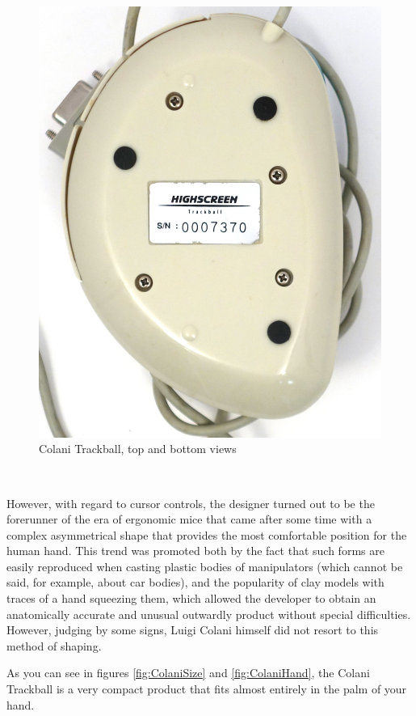 \documentclass[11pt, a4paper]{article}
\begin{document}
\begin{figure}[h]
    \includegraphics[scale=0.4]{1993_colani_trackball/bottom_w_30.jpg}
    \caption{Colani Trackball, top and bottom views}
    \label{fig:ColaniTopBottom}
\end{figure}

~

However, with regard to cursor controls, the designer turned out to be the forerunner of the era of ergonomic mice that came after some time with a complex asymmetrical shape that provides the most comfortable position for the human hand. This trend was promoted both by the fact that such forms are easily reproduced when casting plastic bodies of manipulators (which cannot be said, for example, about car bodies), and the popularity of clay models with traces of a hand squeezing them, which allowed the developer to obtain an anatomically accurate and unusual outwardly product without special difficulties. However, judging by some signs, Luigi Colani himself did not resort to this method of shaping.

As you can see in figures \ref{fig:ColaniSize} and \ref{fig:ColaniHand}, the Colani Trackball is a very compact product that fits almost entirely in the palm of your hand.
\end{document}
